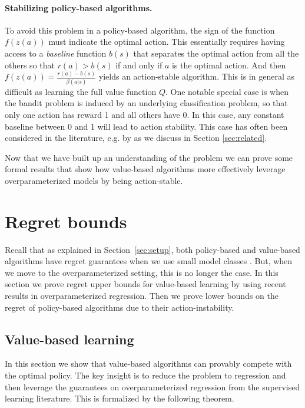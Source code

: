 \paragraph{Stabilizing policy-based algorithms.} To avoid this problem in a policy-based algorithm, the sign of the function $f(z(a))$ must indicate the optimal action. This essentially requires having access to a \emph{baseline} function $ b(s) $ that separates the optimal action from all the others so that $ r(a) > b(s)$ if and only if $ a $ is the optimal action. And then $  f(z(a)) = \frac{r(a) - b(s)}{\beta(a|s)}$ yields an action-stable algorithm. This is in general as difficult as learning the full value function $ Q$. One notable special case is when the bandit problem is induced by an underlying classification problem, so that only one action has reward 1 and all others have 0. In this case, any constant baseline between 0 and 1 will lead to action stability. This case has often been considered in the literature, e.g. by \citet{joachims2018deep} as we discuss in Section \ref{sec:related}.


Now that we have built up an understanding of the problem we can prove some formal results that show how value-based algorithms more effectively leverage overparameterized models by being action-stable.


\section{Regret bounds}

Recall that as explained in Section~\ref{sec:setup}, both policy-based and value-based algorithms have regret guarantees when we use small model classes \cite{strehl2010learning, chen2019information}. But, when we move to the overparameterized setting, this is no longer the case. In this section we prove regret upper bounds for value-based learning by using recent results in overparameterized regression. Then we prove lower bounds on the regret of policy-based algorithms due to their action-instability.

\subsection{Value-based learning}

In this section we show that value-based algorithms can provably compete with the optimal policy.
The key insight is to reduce the problem to regression and then leverage the guarantees on overparameterized regression from the supervised learning literature.
This is formalized by the following theorem.

